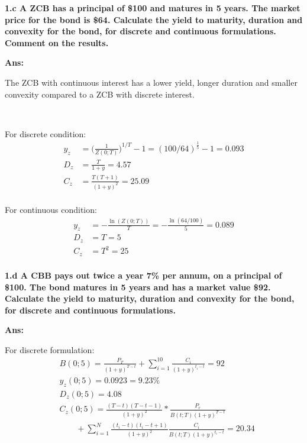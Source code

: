 \documentclass[11pt, notitlepage]{article}
\def\\ln{\mathrm{\ln}}
\def\\exp{\mathrm{\exp}}
\def\\max{\mathrm{\max}}
\begin{document}
\color{red}
\vspace{5mm}
\textbf {1.c A ZCB has a principal of \$100 and matures in 5 years. The market price for the
bond is \$64. Calculate the yield to maturity, duration and convexity for the bond,
for discrete and continuous formulations. Comment on the results.}

\vspace{5mm}
\color{black}
\textbf {Ans:}

The ZCB with continuous interest has a lower yield, longer duration and smaller convexity compared to a ZCB with discrete interest. \

~\

For discrete condition:
\begin{equation*}
\begin{aligned}
y_z &=\big(\frac{1}{Z(0;T)}\big)^{1/T} - 1 = (100/64)^{\frac{1}{5}} - 1 = 0.093\\
D_z &= \frac{T}{1+y} = 4.57\\
C_z &= \frac{T(T+1)}{(1+y)^2} = 25.09\\
\end{aligned}
\end{equation*}

For continuous condition:
\begin{equation*}
\begin{aligned}
y_z &= - \frac{\ln(Z(0;T))}{T} = - \frac{\ln(64/100)}{5} = 0.089\\
D_z &= T = 5\\
C_z &= T^2 = 25\\
\end{aligned}
\end{equation*}



\color{red}
\vspace{5mm}
\textbf {1.d A CBB pays out twice a year 7\% per annum, on a principal of \$100. The bond matures in 5 years and has a market value \$92. Calculate the yield to maturity, duration and convexity for the bond, for discrete and continuous formulations.}

\vspace{5mm}
\color{black}
\textbf {Ans:}

For discrete formulation:
\begin{equation*}
\begin{aligned}
&B(0;5) = \frac{P_T}{(1+y)^{T-t}} + \sum^10_{i=1} \frac{C_i}{(1+y)^{t_i - t} }= 92\\
&y_z(0;5) = 0.0923 = 9.23\%\\ 
&D_z(0;5) = 4.08\\
&C_z(0;5) = \frac{(T-t)(T-t-1)}{(1+y)^2} * \frac{P_r}{B(t;T)(1+y)^{T-t}}\\
&~~~~~~~~~+\sum^N_{i=1} \frac{(t_i-t)(t_i-t+1)}{(1+y)^2} \frac{C_i}{B(t;T)(1+y)^{t_i-t}} = 20.34
\end{aligned}
\end{equation*}
\end{document}
